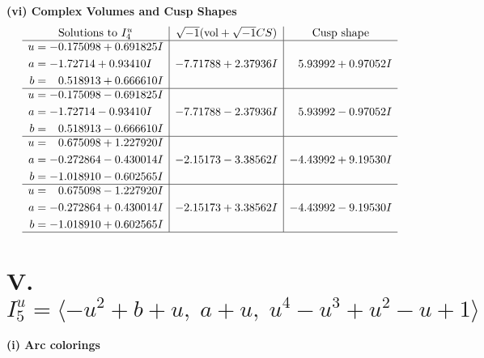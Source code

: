 \documentclass[1p]{elsarticle_modified}
\theoremstyle{definition}
\newcommand{\I}{\sqrt{-1}}
\begin{document}
\newpage\flushleft \textbf{(vi) Complex Volumes and Cusp Shapes}
$$\begin{array}{c|c|c}  
\text{Solutions to }I^u_{4}& \I (\text{vol} + \sqrt{-1}CS) & \text{Cusp shape}\\
 \hline 
\begin{aligned}
u &= -0.175098 + 0.691825 I \\
a &= -1.72714 + 0.93410 I \\
b &= \phantom{-}0.518913 + 0.666610 I\end{aligned}
 & -7.71788 + 2.37936 I & \phantom{-}5.93992 + 0.97052 I \\ \hline\begin{aligned}
u &= -0.175098 - 0.691825 I \\
a &= -1.72714 - 0.93410 I \\
b &= \phantom{-}0.518913 - 0.666610 I\end{aligned}
 & -7.71788 - 2.37936 I & \phantom{-}5.93992 - 0.97052 I \\ \hline\begin{aligned}
u &= \phantom{-}0.675098 + 1.227920 I \\
a &= -0.272864 - 0.430014 I \\
b &= -1.018910 - 0.602565 I\end{aligned}
 & -2.15173 - 3.38562 I & -4.43992 + 9.19530 I \\ \hline\begin{aligned}
u &= \phantom{-}0.675098 - 1.227920 I \\
a &= -0.272864 + 0.430014 I \\
b &= -1.018910 + 0.602565 I\end{aligned}
 & -2.15173 + 3.38562 I & -4.43992 - 9.19530 I\\
 \hline 
 \end{array}$$\newpage\newpage\renewcommand{\arraystretch}{1}
\centering \section*{V. $I^u_{5}= \langle - u^2+b+u,\;a+u,\;u^4- u^3+u^2- u+1 \rangle$}
\flushleft \textbf{(i) Arc colorings}\\
\end{document}
